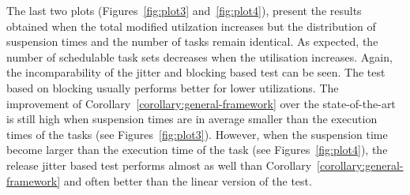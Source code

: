 The last two plots (Figures~\ref{fig:plot3} and~\ref{fig:plot4}), present the results obtained when the total modified utilzation increases but the distribution of suspension times and the number of tasks remain identical. As expected, the number of schedulable task sets decreases when the utilisation increases. Again, the incomparability of the jitter and blocking based test can be seen. The test based on blocking usually performs better for lower utilizations. The improvement of Corollary~\ref{corollary:general-framework} over the state-of-the-art is still high when suspension times are in average smaller than the execution times of the tasks (see Figures~\ref{fig:plot3}). However, when the suspension time become larger than the execution time of the task (see Figures~\ref{fig:plot4}), the release jitter based test performs almost as well than Corollary~\ref{corollary:general-framework} and often better than the linear version of the test.
